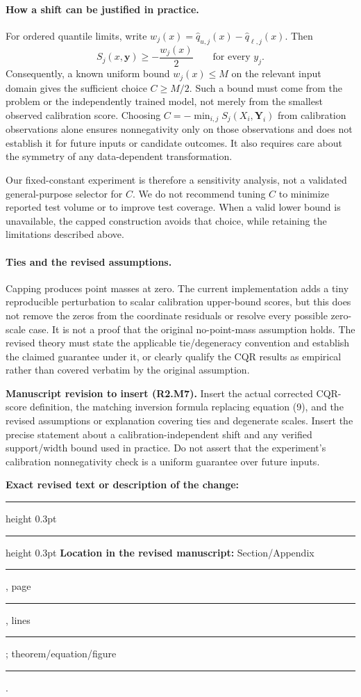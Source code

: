\documentclass[11pt]{article}
\numberwithin{equation}{section}
\newcommand{\revisionblock}[2]{%
  \par\begingroup\color{AuthorRed}\small
  \textbf{Manuscript revision to insert (#1).} #2\par
  \textbf{Exact revised text or description of the change:}\par
  \vspace{0.35em}\hrule height 0.3pt\vspace{1.4em}
  \hrule height 0.3pt\vspace{0.6em}
  \textbf{Location in the revised manuscript:}
  Section/Appendix \rule{1.3cm}{0.3pt},
  page \rule{1cm}{0.3pt},
  lines \rule{1.3cm}{0.3pt};
  theorem/equation/figure \rule{1.4cm}{0.3pt}.
  \par\endgroup}
\begin{document}
\paragraph{How a shift can be justified in practice.}
For ordered quantile limits, write
$w_j(x)=\widehat q_{u,j}(x)-\widehat q_{\ell,j}(x)$. Then
\begin{equation}
 S_j(x,\bm y)\geq-\frac{w_j(x)}{2}
 \qquad\text{for every }y_j.
\end{equation}
Consequently, a known uniform bound $w_j(x)\leq M$ on the relevant
input domain gives the sufficient choice $C\geq M/2$. Such a bound
must come from the problem or the independently trained model,
not merely from the smallest observed calibration score. Choosing
$C=-\min_{i,j}S_j(X_i,\bm Y_i)$ from calibration observations
alone ensures nonnegativity only on those observations and does
not establish it for future inputs or candidate outcomes. It also
requires care about the symmetry of any data-dependent transformation.

Our fixed-constant experiment is therefore a sensitivity analysis,
not a validated general-purpose selector for $C$. We do not
recommend tuning $C$ to minimize reported test volume or to improve
test coverage. When a valid lower bound is unavailable, the capped
construction avoids that choice, while retaining the limitations
described above.

\paragraph{Ties and the revised assumptions.}
Capping produces point masses at zero. The current implementation
adds a tiny reproducible perturbation to scalar calibration
upper-bound scores, but this does not remove the zeros from the
coordinate residuals or resolve every possible zero-scale case.
It is not a proof that the original no-point-mass assumption holds.
The revised theory must state the applicable tie/degeneracy
convention and establish the claimed guarantee under it, or clearly
qualify the CQR results as empirical rather than covered verbatim
by the original assumption.

\revisionblock{R2.M7}{Insert the actual corrected CQR-score
definition, the matching inversion formula replacing equation (9),
and the revised assumptions or explanation covering ties and
degenerate scales. Insert the precise statement about a
calibration-independent shift and any verified support/width bound
used in practice. Do not assert that the experiment's calibration
nonnegativity check is a uniform guarantee over future inputs.}
\end{document}
